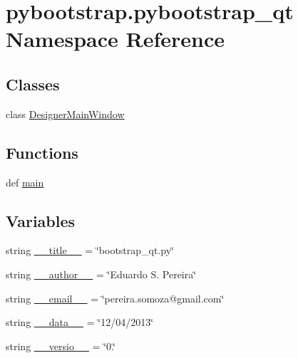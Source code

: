 \hypertarget{namespacepybootstrap_1_1pybootstrap__qt}{\section{pybootstrap.\-pybootstrap\-\_\-qt Namespace Reference}
\label{namespacepybootstrap_1_1pybootstrap__qt}
}
\subsection*{Classes}
\begin{DoxyCompactItemize}
\item 
class \hyperlink{classpybootstrap_1_1pybootstrap__qt_1_1DesignerMainWindow}{Designer\-Main\-Window}
\end{DoxyCompactItemize}
\subsection*{Functions}
\begin{DoxyCompactItemize}
\item 
def \hyperlink{namespacepybootstrap_1_1pybootstrap__qt_a1211e2f29610dd189bc0450f529b798f}{main}
\end{DoxyCompactItemize}
\subsection*{Variables}
\begin{DoxyCompactItemize}
\item 
string \hyperlink{namespacepybootstrap_1_1pybootstrap__qt_a107ac2710bf9bfe21aacee9790eb32d0}{\-\_\-\-\_\-title\-\_\-\-\_\-} = \char`\"{}bootstrap\-\_\-qt.\-py\char`\"{}
\item 
string \hyperlink{namespacepybootstrap_1_1pybootstrap__qt_abfed2364edd31091111a415a950e30b8}{\-\_\-\-\_\-author\-\_\-\-\_\-} = \char`\"{}Eduardo S. Pereira\char`\"{}
\item 
string \hyperlink{namespacepybootstrap_1_1pybootstrap__qt_ad8f2c14d582942563a5e9d72d84676e6}{\-\_\-\-\_\-email\-\_\-\-\_\-} = \char`\"{}pereira.\-somoza@gmail.\-com\char`\"{}
\item 
string \hyperlink{namespacepybootstrap_1_1pybootstrap__qt_accbd3f836c279dd8a8752867c31afadb}{\-\_\-\-\_\-data\-\_\-\-\_\-} = \char`\"{}12/04/2013\char`\"{}
\item 
string \hyperlink{namespacepybootstrap_1_1pybootstrap__qt_a36a00abbfe3b8ee49a7a9f79b3d17560}{\-\_\-\-\_\-versio\-\_\-\-\_\-} = \char`\"{}0.\char`\"{}
\end{DoxyCompactItemize}


